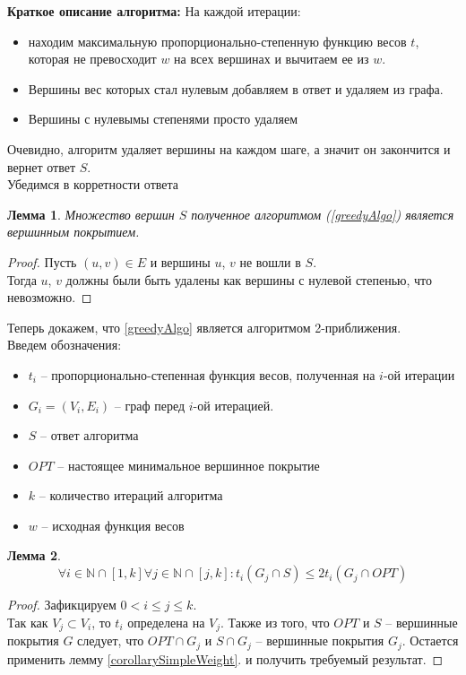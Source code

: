 \documentclass{article}
\newtheorem{lemma}{Лемма}
\theoremstyle{definition}
\begin{document}
  \textbf{Краткое описание алгоритма:}
  На каждой итерации:
  \begin{itemize}
    \item находим максимальную пропорционально-степенную 
  функцию весов $t$, которая не превосходит $w$ на всех вершинах и вычитаем ее из $w$.
    \item Вершины вес которых стал нулевым добавляем в ответ и удаляем из графа.
    \item Вершины с нулевымы степенями просто удаляем
  \end{itemize}
  Очевидно, алгоритм удаляет вершины на каждом шаге, а значит он закончится и вернет ответ $S$.\\
  Убедимся в корретности ответа
  \begin{lemma}
    Множество вершин $S$ полученное алгоритмом (\ref{greedyAlgo}) 
    является вершинным покрытием.
  \end{lemma}
  \begin{proof}
    Пусть $(u, v) \in E$ и вершины $u$, $v$ не вошли в $S$.\\
    Тогда $u$, $v$ должны были быть удалены как вершины с нулевой степенью, 
    что невозможно.
  \end{proof}
  Теперь докажем, что \ref{greedyAlgo} является алгоритмом 2-приближения.\\
  Введем обозначения:
  \begin{itemize}
    \item $t_i$ -- пропорционально-степенная функция весов, полученная на $i$-ой итерации
    \item $G_i=(V_i, E_i)$ -- граф перед $i$-ой итерацией.
    \item $S$ -- ответ алгоритма
    \item $OPT$ -- настоящее минимальное вершинное покрытие
    \item $k$ -- количество итераций алгоритма
    \item $w$ -- исходная функция весов
  \end{itemize}
  \begin{lemma}\label{greedySumElementLem}
    $$
      \forall i \in \mathbb{N} \cap \left[1, k\right]
      \forall j \in \mathbb{N} \cap \left[j, k\right]: 
      t_i(G_j \cap S) \le 2t_i(G_j \cap OPT)
    $$
  \end{lemma}
  \begin{proof}
    Зафикцируем $0 < i \le j \le k$.\\
    Так как $V_j \subset V_i$, то $t_i$ определена на $V_j$.
    Также из того, что $OPT$ и $S$ -- вершинные покрытия $G$ следует, 
    что $OPT\cap G_j$ и $S \cap G_j$ -- вершинные покрытия $G_j$.
    Остается применить лемму \ref{corollarySimpleWeight}.
    и получить требуемый результат.
  \end{proof}
\end{document}
